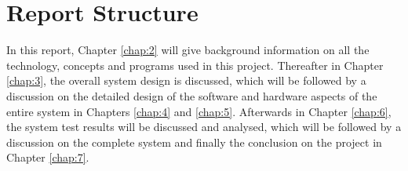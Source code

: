 \section{Report Structure}

In this report, Chapter \ref{chap:2} will give background information on all the
technology, concepts and programs used in this project. Thereafter in Chapter
\ref{chap:3}, the overall system design is discussed, which will be followed by
a discussion on the detailed design of the software and hardware aspects of the
entire system in Chapters \ref{chap:4} and \ref{chap:5}. Afterwards in
Chapter \ref{chap:6}, the system test results will be discussed and analysed,
which will be followed by a discussion on the complete system and finally the
conclusion on the project in Chapter \ref{chap:7}.
